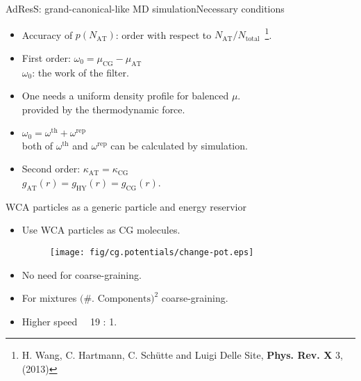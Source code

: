\documentclass[]{beamer}
\newcommand{\redc}[1]{{\color{red} #1}}
\newcommand{\bluec}[1]{{\color{blue} #1}}
\newcommand{\AT}{{\textrm{{AT}}}}
\newcommand{\CG}{{\textrm{CG}}}
\newcommand{\HY}{{\textrm{HY}}}
\newcommand{\thf}{{\textrm{th}}}
\newcommand{\rep}{{\textrm{rep}}}
\begin{document}
\begin{frame}{AdResS: grand-canonical-like MD simulation}{Necessary conditions}
  \begin{itemize}
    \vfill
  \item<1-> Accuracy of \bluec{$p(N_\AT) $}: order with respect to
    \bluec{$N_\AT / N_{\textrm{total}}$}~\footnote{H. Wang, C. Hartmann, C. Sch\"utte and Luigi Delle Site, \textbf{Phys. Rev. X} 3, (2013)}.
    \vfill
  \item<2-> \bluec{First order}: \redc{$ \omega_0 = \mu_{\CG} - \mu_{\AT}$}\\
    $\omega_0$: the work of the filter.
    \vfill
  \item<3-> One needs a uniform density profile for balenced $\mu$.\\
    provided by the \redc{thermodynamic force}.
    \vfill
  \item<4-> \redc{$ \omega_0 = \omega^\thf + \omega^\rep$}\\
    both of $\omega^\thf$ and $\omega^\rep$ can be calculated by simulation.
    \vfill
  \item<5-> \bluec{Second order}: \redc{$\kappa_\AT = \kappa_{\CG}$}\\
    $g_\AT (r) = g_\HY(r) = g_\CG(r)$.
    \vfill
  \end{itemize}  
\end{frame}


\begin{frame}{WCA particles as a generic particle and energy reservior}
  \begin{itemize}
    \vfill
  \item<1-> Use WCA particles as CG molecules.
    \begin{figure}
      \centering 
      \texttt{[image: fig/cg.potentials/change-pot.eps]}
    \end{figure}   
  \item<2-> No need for coarse-graining.
    \vfill
  \item<3-> For mixtures $\textrm{(\#. Components)}^2$ coarse-graining.
    \vfill
  \item<4-> Higher speed\ \ \Large{\redc{19} : \bluec{1}}.
    \vfill
  \end{itemize}
\end{frame}
\end{document}
